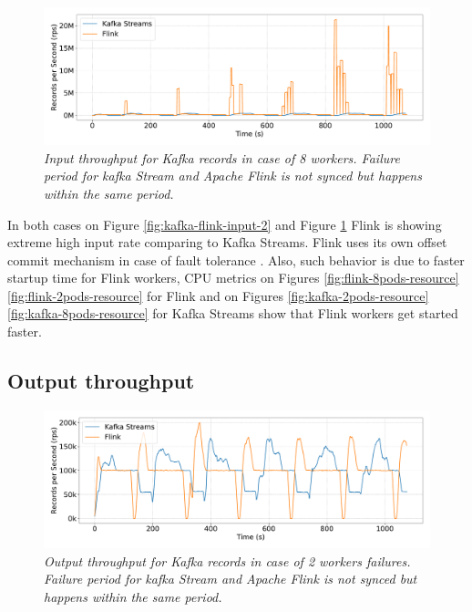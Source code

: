 \begin{figure}[H]
    \centering
    \includegraphics[width=1\textwidth]{figures/kafka-flink/input-throughput-8pod-kafka-flink}
    \caption{\textit{Input throughput for Kafka records in case of 8 workers.
    Failure period for kafka Stream and Apache Flink is not synced but happens within the same period.}}
    \label{fig:kafka-flink-input-8}
\end{figure}


In both cases on Figure \ref{fig:kafka-flink-input-2} and Figure \ref{fig:kafka-flink-input-8}
Flink is showing extreme high input rate comparing to Kafka Streams.
Flink uses its own offset commit mechanism in case of fault tolerance \cite{flink_kafka_offset}.
Also, such behavior is due to faster startup time for Flink workers, CPU metrics
on Figures \ref{fig:flink-8pods-resource} \ref{fig:flink-2pods-resource} for Flink
and on Figures \ref{fig:kafka-2pods-resource} \ref{fig:kafka-8pods-resource} for Kafka Streams
show that Flink workers get started faster.


\subsection{Output throughput}\label{subsec:output-throughtput}

\begin{figure}[H]
    \centering
    \includegraphics[width=1\textwidth]{figures/kafka-flink/output-throught-2pods-kafka-flink}
    \caption{\textit{Output throughput for Kafka records in case of 2 workers failures.
    Failure period for kafka Stream and Apache Flink is not synced but happens within the same period.}}
    \label{fig:kafka-flink-out-2}
\end{figure}


